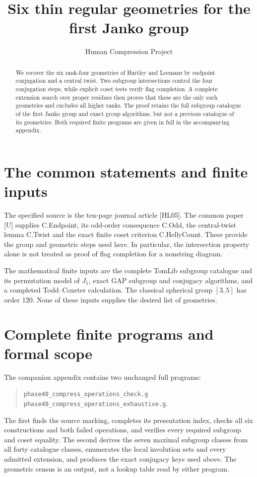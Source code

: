 
\title{Six thin regular geometries for the first Janko group}
\author{Human Compression Project}
\date{}

\maketitle
\begin{abstract}
We recover the six rank-four geometries of Hartley and Leemans by
endpoint conjugation and a central twist. Two subgroup intersections
control the four conjugation steps, while explicit coset tests verify
flag completion. A complete extension search over proper residues
then proves that these are the only such geometries and excludes all
higher ranks. The proof retains the full subgroup catalogue of the
first Janko group and exact group algorithms, but not a previous
catalogue of its geometries. Both required finite programs are given
in full in the accompanying appendix.
\end{abstract}
\section{The common statements and finite inputs}
The specified source is the ten-page journal article [HL05]. The
common paper [U] supplies C.Endpoint, its odd-order consequence
C.Odd, the central-twist lemma C.Twist and the exact finite coset
criterion C.HellyCount. These provide the group and geometric steps
used here. In particular, the intersection property alone is not
treated as proof of flag completion for a nonstring diagram.

The mathematical finite inputs are the complete TomLib subgroup
catalogue and its permutation model of $J_1$, exact GAP subgroup and
conjugacy algorithms, and a completed Todd--Coxeter calculation.
The classical spherical group $[3,5]$ has order $120$.
None of these inputs supplies the desired list of geometries.

\section{Complete finite programs and formal scope}
The companion appendix contains two unchanged full programs:
\begin{quote}\small
\texttt{phase40\_compress\_operations\_check.g}\\
\texttt{phase40\_compress\_operations\_exhaustive.g}.
\end{quote}
The first finds the source marking, completes its presentation index,
checks all six constructions and both failed operations, and verifies
every required subgroup and coset equality. The second derives the
seven maximal subgroup classes from all forty catalogue classes,
enumerates the local involution sets and every admitted extension,
and produces the exact conjugacy keys used above. The geometric
census is an output, not a lookup table read by either program.


